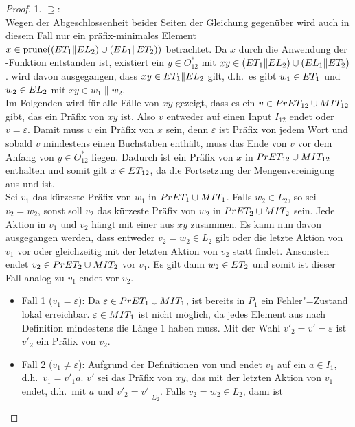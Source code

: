 \begin{proof}
  1. \glqq$\supseteq$\grqq{}:\\
  Wegen der Abgeschlossenheit beider Seiten der Gleichung gegenüber \cont{}
  wird auch in diesem Fall nur ein präfix-minimales Element $x\in\mathrm{prune} ((ET
  _1\|EL _2)\cup (EL _1\| ET _2))$ betrachtet. Da $x$ durch die Anwendung
  der \prune{}-Funktion entstanden ist, existiert ein $y\in O_{12} ^*$ mit
  $xy\in (ET _1\|EL _2)\cup (EL _1\| ET _2)$. \OBdA{} wird davon
  ausgegangen, dass $xy\in ET _1\| EL _2$ gilt, d.h.\ es gibt $w_1\in ET _1$
  und $w_2\in EL _2$ mit $xy \in w_1\| w_2$.\\
  Im Folgenden wird für alle Fälle von $xy$ gezeigt, dass es ein $v\in PrET
  _{12} \cup MIT _{12}$ gibt, das ein Präfix von $xy$ ist. Also $v$ entweder
  auf einen Input $I_{12}$ endet oder $v=\varepsilon$. Damit muss $v$ ein
  Präfix von $x$ sein, denn $\varepsilon$ ist Präfix von jedem Wort und sobald
  $v$ mindestens einen Buchstaben enthält, muss das Ende von $v$ vor dem Anfang
  von $y\in O_{12}^*$ liegen. Dadurch ist ein Präfix von $x$ in $PrET
  _{12}\cup MIT _{12}$ enthalten und somit gilt $x\in ET _{12}$, da \ET{} die
  Fortsetzung der Mengenvereinigung aus \PrET{} und \MIT{} ist.\\
  Sei $v_1$ das kürzeste Präfix von $w_1$ in $PrET _1\cup MIT _1$. Falls $w_2
  \in L_2$, so sei $v_2=w_2$, sonst soll $v_2$ das kürzeste Präfix von $w_2$ in
  $PrET _2\cup MIT _2$ sein. Jede Aktion in $v_1$ und $v_2$ hängt mit einer
  aus $xy$ zusammen. Es kann nun davon ausgegangen werden, dass entweder $v_2 =
  w_2\in L_2$ gilt oder die letzte Aktion von $v_1$ vor oder gleichzeitig mit
  der letzten Aktion von $v_2$ statt findet. Ansonsten endet $v_2 \in PrET
  _2\cup MIT _2$ vor $v_1$. Es gilt dann $w_2\in ET _2$ und somit ist dieser
  Fall analog zu $v_1$ endet vor $v_2$.
  \begin{itemize}
    \item Fall 1 ($v_1=\varepsilon$): Da $\varepsilon\in PrET _1\cup MIT _1$,
      ist bereits in $P_1$ ein Fehler"=Zustand lokal erreichbar. $\varepsilon
      \in MIT _1$ ist nicht möglich, da jedes Element aus \MIT{} nach
      Definition mindestens die Länge $1$ haben muss. Mit der Wahl
      $v'_2=v'=\varepsilon$ ist $v'_2$ ein Präfix von $v_2$.
    \item Fall 2 ($v_1\neq\varepsilon$): Aufgrund der Definitionen von \PrET{}
      und \MIT{} endet $v_1$ auf ein $a\in I_1$, d.h.\ $v_1=v'_1a$. $v'$ sei
      das Präfix von $xy$, das mit der letzten Aktion von $v_1$ endet, d.h.\
      mit $a$ und $v'_2=v'|_{\Sigma _2}$. Falls $v_2=w_2\in L_2$, dann ist

\end{itemize}
\end{proof}
